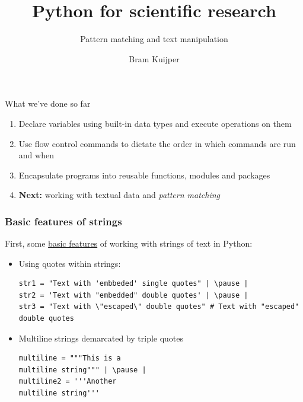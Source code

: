 \documentclass[xcolor=table]{beamer}
\title[Python for scientific research]{Python for scientific research}
\subtitle{Pattern matching and text manipulation}
\author{Bram Kuijper}
\institute[]{University of Exeter, Penryn Campus, UK}
\begin{document}
\begin{frame}
\titlepage
\end{frame}

\begin{frame}{What we've done so far}

	\begin{enumerate}\addtolength{\itemsep}{1\baselineskip}
		\item Declare variables using built-in data types and execute operations
		on them
		\item Use flow control commands to dictate the order in which commands are run
		and when
		\item Encapsulate programs into reusable functions, modules and packages
        \item \textbf{Next:} working with textual data and \emph{pattern matching}
	\end{enumerate}

\end{frame}
\begin{frame}[fragile]
    \frametitle{Basic features of strings}
    First, some \href{https://docs.python.org/3/library/stdtypes.html#text-sequence-type-str}{basic features} of working with strings of text in Python:
        \begin{itemize}
            \item Using quotes within strings:
\begin{lstlisting}[style=python]
str1 = "Text with 'embbeded' single quotes" | \pause |
str2 = 'Text with "embedded" double quotes' | \pause |
str3 = "Text with \"escaped\" double quotes" # Text with "escaped" double quotes 
\end{lstlisting}
\pause
            \item Multiline strings demarcated by triple quotes 
                \pause
\begin{lstlisting}[style=python]
multiline = """This is a 
multiline string""" | \pause |
multiline2 = '''Another
multiline string'''
\end{lstlisting}
        \end{itemize}
\end{frame}
\end{document}
